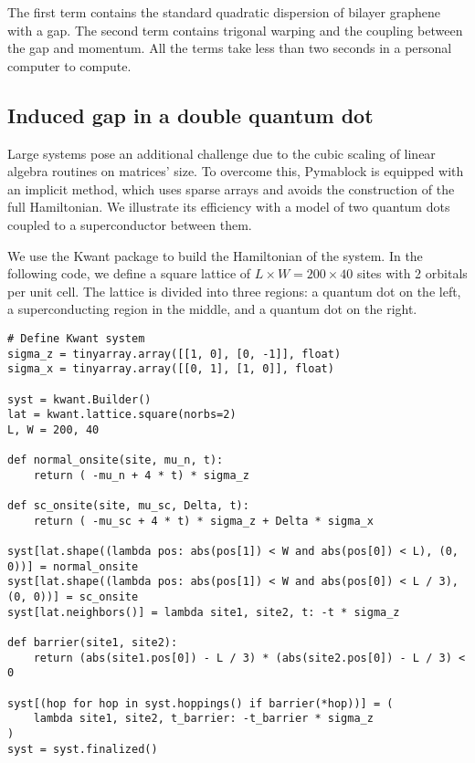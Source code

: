 %
The first term contains the standard quadratic dispersion of bilayer graphene
with a gap.
The second term contains trigonal warping and the coupling between the gap and
momentum.
All the terms take less than two seconds in a personal computer to compute.

\subsection{Induced gap in a double quantum dot}

Large systems pose an additional challenge due to the cubic scaling of linear
algebra routines on matrices' size.
To overcome this, Pymablock is equipped with an implicit method, which uses
sparse arrays and avoids the construction of the full Hamiltonian.
We illustrate its efficiency with a model of two quantum dots coupled to a
superconductor between them.

We use the Kwant package \cite{Groth_2014} to build
the Hamiltonian of the system.
In the following code, we define a square lattice of $L \times W = 200 \times
40$ sites with 2 orbitals per unit cell.
The lattice is divided into three regions: a quantum dot on the left, a
superconducting region in the middle, and a quantum dot on the right.
%
\begin{verbatim}
# Define Kwant system
sigma_z = tinyarray.array([[1, 0], [0, -1]], float)
sigma_x = tinyarray.array([[0, 1], [1, 0]], float)

syst = kwant.Builder()
lat = kwant.lattice.square(norbs=2)
L, W = 200, 40

def normal_onsite(site, mu_n, t):
    return ( -mu_n + 4 * t) * sigma_z

def sc_onsite(site, mu_sc, Delta, t):
    return ( -mu_sc + 4 * t) * sigma_z + Delta * sigma_x

syst[lat.shape((lambda pos: abs(pos[1]) < W and abs(pos[0]) < L), (0, 0))] = normal_onsite
syst[lat.shape((lambda pos: abs(pos[1]) < W and abs(pos[0]) < L / 3), (0, 0))] = sc_onsite
syst[lat.neighbors()] = lambda site1, site2, t: -t * sigma_z

def barrier(site1, site2):
    return (abs(site1.pos[0]) - L / 3) * (abs(site2.pos[0]) - L / 3) < 0

syst[(hop for hop in syst.hoppings() if barrier(*hop))] = (
    lambda site1, site2, t_barrier: -t_barrier * sigma_z
)
syst = syst.finalized()
\end{verbatim}


